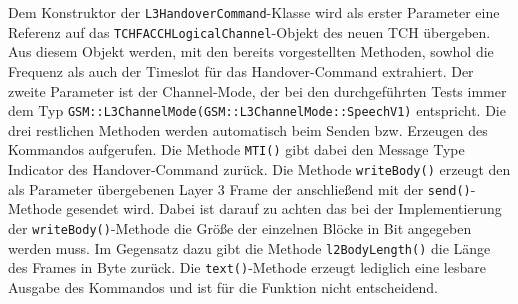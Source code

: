 Dem Konstruktor der \lstinline{L3HandoverCommand}-Klasse wird als erster Parameter eine Referenz auf das \lstinline{TCHFACCHLogicalChannel}-Objekt des neuen TCH übergeben. Aus diesem Objekt werden, mit den bereits vorgestellten Methoden, sowhol die Frequenz als auch der Timeslot für das Handover-Command extrahiert. Der zweite Parameter ist der Channel-Mode, der bei den durchgeführten Tests immer dem Typ \lstinline{GSM::L3ChannelMode(GSM::L3ChannelMode::SpeechV1)} entspricht. Die drei restlichen Methoden werden automatisch beim Senden bzw. Erzeugen des Kommandos aufgerufen. Die Methode \lstinline{MTI()} gibt dabei den Message Type Indicator des Handover-Command zurück. Die Methode \lstinline{writeBody()} erzeugt den als Parameter übergebenen Layer 3 Frame der anschließend mit der \lstinline{send()}-Methode gesendet wird. Dabei ist darauf zu achten das bei der Implementierung der \lstinline{writeBody()}-Methode die Größe der einzelnen Blöcke in Bit angegeben werden muss. Im Gegensatz dazu gibt die Methode \lstinline{l2BodyLength()} die Länge des Frames in Byte zurück. Die \lstinline{text()}-Methode erzeugt lediglich eine lesbare Ausgabe des Kommandos und ist für die Funktion nicht entscheidend.
